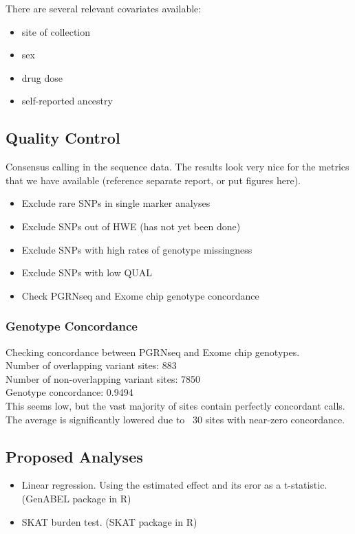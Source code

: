 \documentclass[paper=a4, fontsize=11pt]{scrartcl}	%
\numberwithin{equation}{section}		%
\numberwithin{figure}{section}			%
\numberwithin{table}{section}				%
\begin{document}
There are several relevant covariates available:
	\begin{itemize}
		\item site of collection
		\item sex
		\item drug dose
		\item self-reported ancestry
	\end{itemize}

	\subsection{Quality Control}
	Consensus calling in the sequence data. The results look very nice for the metrics that we have available (reference separate report, or put figures here).
	
	\begin{itemize}
		\item Exclude rare SNPs in single marker analyses
		\item Exclude SNPs out of HWE (has not yet been done)
		\item Exclude SNPs with high rates of genotype missingness
		\item Exclude SNPs with low QUAL
		\item Check PGRNseq and Exome chip genotype concordance
	\end{itemize}

	\subsubsection{Genotype Concordance}
	Checking concordance between PGRNseq and Exome chip genotypes. \\
	
	Number of overlapping variant sites: 883 \\
	Number of non-overlapping variant sites: 7850 \\
	Genotype concordance: 0.9494 \\
	
	This seems low, but the vast majority of sites contain perfectly concordant calls. The average is significantly lowered due to ~30 sites with near-zero concordance. 
	
	\subsection{Proposed Analyses}
	\begin{itemize}
		\item Linear regression. Using the estimated effect and its eror as a t-statistic. (GenABEL package in R)
		\item SKAT burden test. (SKAT package in R)
	\end{itemize}
	
\end{document}
